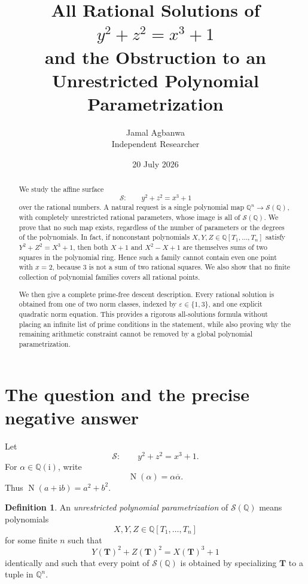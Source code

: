 \documentclass[11pt,a4paper]{article}
\title{\bfseries All Rational Solutions of
\texorpdfstring{$y^2+z^2=x^3+1$}{y2+z2=x3+1}\\
\large and the Obstruction to an Unrestricted Polynomial Parametrization}
\author{Jamal Agbanwa\\[2pt]\small Independent Researcher}
\date{20 July 2026}
\numberwithin{equation}{section}
\theoremstyle{definition}
\newtheorem{definition}[theorem]{Definition}
\newcommand{\Q}{\mathbb Q}
\newcommand{\ii}{\mathrm i}
\newcommand{\N}{\operatorname N}
\newcommand{\ol}[1]{\overline{#1}}
\begin{document}
\maketitle

\begin{abstract}
We study the affine surface
\[
\mathcal S:\qquad y^2+z^2=x^3+1
\]
over the rational numbers.  A natural request is a single polynomial map
$\Q^n\to\mathcal S(\Q)$, with completely unrestricted rational parameters,
whose image is all of $\mathcal S(\Q)$.  We prove that no such map exists,
regardless of the number of parameters or the degrees of the polynomials.
In fact, if nonconstant polynomials $X,Y,Z\in\Q[T_1,\ldots,T_n]$ satisfy
$Y^2+Z^2=X^3+1$, then both $X+1$ and $X^2-X+1$ are themselves sums of two
squares in the polynomial ring.  Hence such a family cannot contain even one
point with $x=2$, because $3$ is not a sum of two rational squares.  We also
show that no finite collection of polynomial families covers all rational
points.

We then give a complete prime-free descent description.  Every rational
solution is obtained from one of two norm classes, indexed by
$\varepsilon\in\{1,3\}$, and one explicit quadratic norm equation.  This
provides a rigorous all-solutions formula without placing an infinite list of
prime conditions in the statement, while also proving why the remaining
arithmetic constraint cannot be removed by a global polynomial
parametrization.
\end{abstract}

\tableofcontents

\section{The question and the precise negative answer}

Let
\begin{equation}
 \mathcal S:\qquad y^2+z^2=x^3+1.
 \label{eq:surface}
\end{equation}
For $\alpha\in\Q(\ii)$, write
\[
 \N(\alpha)=\alpha\ol\alpha.
\]
Thus $\N(a+\ii b)=a^2+b^2$.

\begin{definition}
An \emph{unrestricted polynomial parametrization} of $\mathcal S(\Q)$ means
polynomials
\[
 X,Y,Z\in\Q[T_1,\ldots,T_n]
\]
for some finite $n$ such that
\[
 Y(\mathbf T)^2+Z(\mathbf T)^2=X(\mathbf T)^3+1
\]
identically and such that every point of $\mathcal S(\Q)$ is obtained by
specializing $\mathbf T$ to a tuple in $\Q^n$.
\end{definition}
\end{document}
